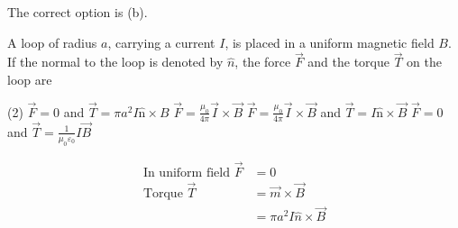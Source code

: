 \begin{enumerate}
\begin{answer}
	The correct option is (b).	
\end{answer}
\begin{minipage}{\textwidth}
	\item A loop of radius $a$, carrying a current $I$, is placed in a uniform magnetic field $B$. If the normal to the loop is denoted by $\hat{n}$, the force $\vec{F}$ and the torque $\vec{T}$ on the loop are
\end{minipage}
\begin{tasks}(2)
	\task[\textbf{A.}] $\vec{F}=0$ and $\vec{T}=\pi a^{2} I \hat{\mathrm{n}} \times B$
	\task[\textbf{B.}]$\vec{F}=\frac{\mu_{0}}{4 \pi} \vec{I} \times \vec{B}$
	\task[\textbf{C.}]$\vec{F}=\frac{\mu_{0}}{4 \pi} \vec{I} \times \vec{B}$ and $\vec{T}=I \hat{\mathrm{n}} \times \vec{B}$
	\task[\textbf{D.}]$\vec{F}=0$ and $\vec{T}=\frac{1}{\mu_{0} \varepsilon_{0}} I \vec{B}$
\end{tasks}
\begin{answer}
	\begin{align*}
	\text{In uniform field } \vec{F}&=0\\
	\text{Torque } \vec{T}&=\vec{m} \times \vec{B}\\&=\pi a^{2} I\hat{n}\times \vec{B}
	\end{align*}


\end{answer}
\end{enumerate}
